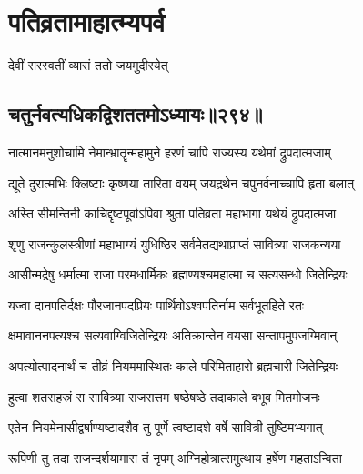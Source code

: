 \part{पतिव्रतामाहात्म्यपर्व}
\newcommand{\onelineindentedshloka}[2]{
    {#1\hspace{\shlokaspaceskip}}\\
\onelineshloka{\hspace{\shlokaspaceskip}#2}}


{देवीं सरस्वतीं व्यासं ततो जयमुदीरयेत्}

\chapter{चतुर्नवत्यधिकद्विशततमोऽध्यायः॥२९४॥}


\twolineshloka
{नात्मानमनुशोचामि नेमान्भ्रातॄन्महामुने}
{हरणं चापि राज्यस्य यथेमां द्रुपदात्मजाम्}


\twolineshloka
{द्यूते दुरात्मभिः क्लिष्टाः कृष्णया तारिता वयम्}
{जयद्रथेन चपुनर्वनाच्चापि हृता बलात्}


\twolineshloka
{अस्ति सीमन्तिनी काचिद्दृष्टपूर्वाऽपिवा श्रुता}
{पतिव्रता महाभागा यथेयं द्रुपदात्मजा}




\twolineshloka
{शृणु राजन्कुलस्त्रीणां महाभाग्यं युधिष्ठिर}
{सर्वमेतद्यथाप्राप्तं सावित्र्या राजकन्यया}


\twolineshloka
{आसीन्मद्रेषु धर्मात्मा राजा परमधार्मिकः}
{ब्रह्मण्यश्चमहात्मा च सत्यसन्धो जितेन्द्रियः}


\twolineshloka
{यज्वा दानपतिर्दक्षः पौरजानपदप्रियः}
{पार्थिवोऽश्वपतिर्नाम सर्वभूतहिते रतः}


\twolineshloka
{क्षमावाननपत्यश्च सत्यवाग्विजितेन्द्रियः}
{अतिक्रान्तेन वयसा सन्तापमुपजग्मिवान्}


\twolineshloka
{अपत्योत्पादनार्थं च तीव्रं नियममास्थितः}
{काले परिमिताहारो ब्रह्मचारी जितेन्द्रियः}


\twolineshloka
{हुत्वा शतसहस्रं स सावित्र्या राजसत्तम}
{षष्ठेषष्ठे तदाकाले बभूव मितमोजनः}


\twolineshloka
{एतेन नियमेनासीद्वर्षाण्यष्टादशैव तु}
{पूर्णे त्वष्टादशे वर्षे सावित्री तुष्टिमभ्यगात्}


\twolineshloka
{रूपिणी तु तदा राजन्दर्शयामास तं नृपम्}
{अग्निहोत्रात्समुत्थाय हर्षेण महताऽन्विता}


